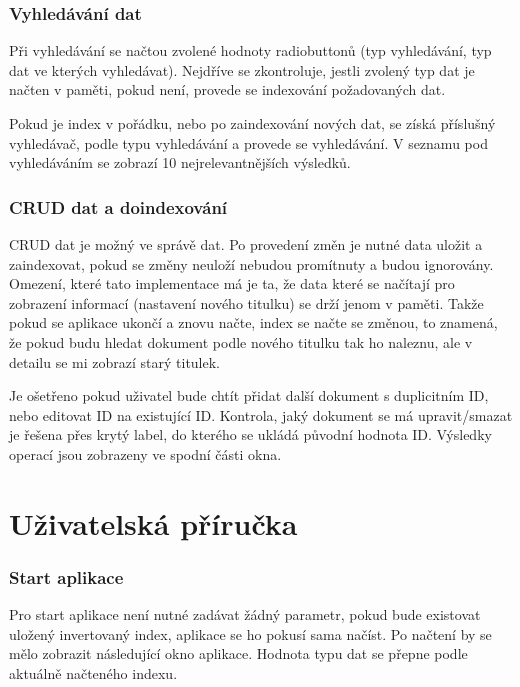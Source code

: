 \documentclass[12pt, a4paper]{article}
\begin{document}
\subsubsection{Vyhledávání dat}
\noindent Při vyhledávání se načtou zvolené hodnoty radiobuttonů (typ vyhledávání, typ dat ve kterých vyhledávat). Nejdříve se zkontroluje, jestli zvolený typ dat je načten v paměti, pokud není, provede se indexování požadovaných dat.

Pokud je index v pořádku, nebo po zaindexování nových dat, se získá příslušný vyhledávač, podle typu vyhledávání a provede se vyhledávání. V seznamu pod vyhledáváním se zobrazí 10 nejrelevantnějších výsledků.

\subsubsection{CRUD dat a doindexování}\label{crud}
\noindent CRUD dat je možný ve správě dat. Po provedení změn je nutné data uložit a zaindexovat, pokud se změny neuloží nebudou promítnuty a budou ignorovány. Omezení, které tato implementace má je ta, že data které se načítají pro zobrazení informací (nastavení nového titulku) se drží jenom v paměti. Takže pokud se aplikace ukončí a znovu načte, index se načte se změnou, to znamená, že pokud budu hledat dokument podle nového titulku tak ho naleznu, ale v detailu se mi zobrazí starý titulek.

Je ošetřeno pokud uživatel bude chtít přidat další dokument s duplicitním ID, nebo editovat ID na existující ID. Kontrola, jaký dokument se má upravit/smazat je řešena přes krytý label, do kterého se ukládá původní hodnota ID. Výsledky operací jsou zobrazeny ve spodní části okna.

\section{Uživatelská příručka}
\subsubsection{Start aplikace}
\noindent Pro start aplikace není nutné zadávat žádný parametr, pokud bude existovat uložený invertovaný index, aplikace se ho pokusí sama načíst. Po načtení by se mělo zobrazit následující okno aplikace. Hodnota typu dat se přepne podle aktuálně načteného indexu.
\end{document}
